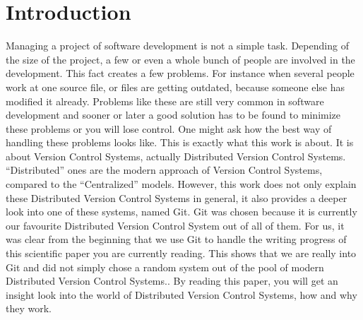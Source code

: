 \section {Introduction}

Managing a project of software development is not a simple task. Depending of the size of the project, a few or even a whole bunch of people are involved in the development. This fact creates a few problems. For instance when several people work at one source file, or files are getting outdated, because someone else has modified it already. Problems like these are still very common in software development and sooner or later a good solution has to be found to minimize these problems or you will lose control. One might ask how the best way of handling these problems looks like.
This is exactly what this work is about. It is about Version Control Systems, actually Distributed Version Control Systems. "`Distributed"' ones are the modern approach of Version Control Systems, compared to the "`Centralized"' models. However, this work does not only explain these Distributed Version Control Systems in general, it also provides a deeper look into one of these systems, named Git.
Git was chosen because it is currently our favourite Distributed Version Control System out of all of them. For us, it was clear from the beginning that we use Git to handle the writing progress of this scientific paper you are currently reading. This shows that we are really into Git and did not simply chose a random system out of the pool of modern Distributed Version Control Systems..
By reading this paper, you will get an insight look into the world of Distributed Version Control Systems, how and why they work.

